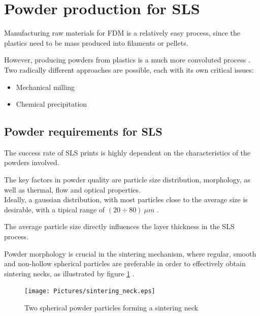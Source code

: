\documentclass{article}
\begin{document}
    \section{Powder production for SLS \label{Powder_production}}

    Manufacturing raw materials for FDM is a relatively easy process, since the plastics need to be mass produced into filaments or pellets.

    However, producing powders from plastics is a much more convoluted process \autocites{doi:10.1063/1.4918516,Dechet_Schmidt_thermal_rounding,Recent_progress_polymers_AM}. \\ 

    Two radically different approaches are possible, each with its own critical issues: 

    \begin{itemize}
        \item Mechanical milling
        \item Chemical precipitation
    \end{itemize} 

    \subsection{Powder requirements for SLS \label{Powder_requirements}}

    The success rate of SLS prints is highly dependent on the characteristics of the powders involved. 

    The key factors in powder quality are particle size distribution, morphology, as well as thermal, flow and optical properties. \\
    
    Ideally, a gaussian distribution, with most particles close to the average size is desirable, 
    with a tipical range of $(20 \div 80) \ \mu m$ \autocite*{doi:10.1063/1.4918516}. 

    The average particle size directly influences the layer thickness in the SLS process.  
    
    Powder morphology is crucial in the sintering mechanism, where regular, smooth and non-hollow spherical 
    particles are preferable in order to effectively obtain sintering necks, as illustrated by figure \ref{fig:SLS_sintering_neck} \autocite*{doi:10.1063/1.4918516}.  

    \begin{figure}[h!]
        \centering
        \texttt{[image: Pictures/sintering\_neck.eps]}\\
        \caption{Two spherical powder particles forming a sintering neck \autocite{Inkscape}} 
        \label{fig:SLS_sintering_neck}
    \end{figure}
\end{document}
